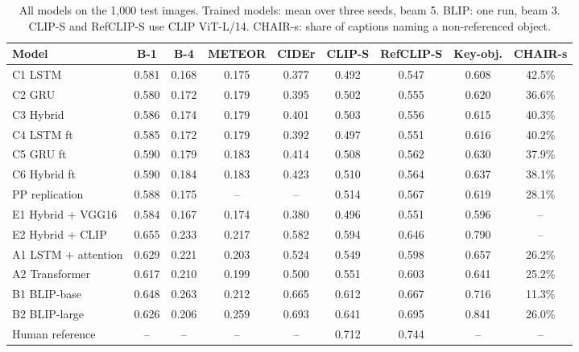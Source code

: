 \documentclass[11pt]{article}
\newcommand{\tbl}[2]{\caption{#1}{\sffamily\small #2}}
\newcommand{\tabnote}[1]{\par\vspace{3pt}{\noindent\sffamily\footnotesize\raggedright #1\par}}
\begin{document}
\begin{table}[H]\centering
\tbl{All models on the 1,000 test images. Trained models: mean over three seeds, beam 5. BLIP: one run, beam 3. CLIP-S and RefCLIP-S use CLIP ViT-L/14. CHAIR-s: share of captions naming a non-referenced object.}
{\begin{tabular}{lcccccccc}\toprule
Model & B-1 & B-4 & METEOR & CIDEr & CLIP-S & RefCLIP-S & Key-obj. & CHAIR-s\\\midrule
C1 LSTM & 0.581 & 0.168 & 0.175 & 0.377 & 0.492 & 0.547 & 0.608 & 42.5\%\\
C2 GRU & 0.580 & 0.172 & 0.179 & 0.395 & 0.502 & 0.555 & 0.620 & 36.6\%\\
C3 Hybrid & 0.586 & 0.174 & 0.179 & 0.401 & 0.503 & 0.556 & 0.615 & 40.3\%\\
C4 LSTM ft & 0.585 & 0.172 & 0.179 & 0.392 & 0.497 & 0.551 & 0.616 & 40.2\%\\
C5 GRU ft & 0.590 & 0.179 & 0.183 & 0.414 & 0.508 & 0.562 & 0.630 & 37.9\%\\
C6 Hybrid ft & 0.590 & 0.184 & 0.183 & 0.423 & 0.510 & 0.564 & 0.637 & 38.1\%\\
PP replication & 0.588 & 0.175 & -- & -- & 0.514 & 0.567 & 0.619 & 28.1\%\\
E1 Hybrid + VGG16 & 0.584 & 0.167 & 0.174 & 0.380 & 0.496 & 0.551 & 0.596 & --\\
E2 Hybrid + CLIP & 0.655 & 0.233 & 0.217 & 0.582 & 0.594 & 0.646 & 0.790 & --\\
A1 LSTM + attention & 0.629 & 0.221 & 0.203 & 0.524 & 0.549 & 0.598 & 0.657 & 26.2\%\\
A2 Transformer & 0.617 & 0.210 & 0.199 & 0.500 & 0.551 & 0.603 & 0.641 & 25.2\%\\
B1 BLIP-base & 0.648 & 0.263 & 0.212 & 0.665 & 0.612 & 0.667 & 0.716 & 11.3\%\\
B2 BLIP-large & 0.626 & 0.206 & 0.259 & 0.693 & 0.641 & 0.695 & 0.841 & 26.0\%\\\midrule
Human reference & -- & -- & -- & -- & 0.712 & 0.744 & -- & --\\\bottomrule
\end{tabular}}
\tabnote{``--'' = not computed for that model. PP: paper-protocol replication (single seed).}
\label{tab:all}
\end{table}
\end{document}
